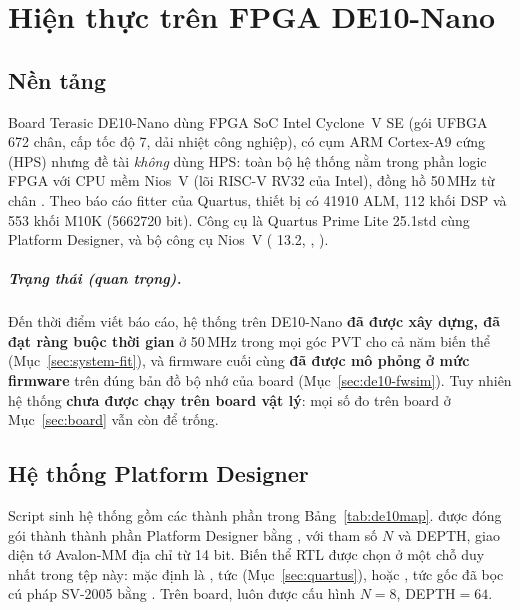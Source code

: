 \chapter{Hiện thực trên FPGA DE10-Nano}
\label{ch:fpga}

\section{Nền tảng}
Board Terasic DE10-Nano \cite{de10nano} dùng FPGA SoC Intel Cyclone~V SE  (gói UFBGA 672 chân, cấp tốc độ 7, dải nhiệt công nghiệp), có cụm ARM Cortex-A9 cứng (HPS) nhưng đề tài \emph{không} dùng HPS: toàn bộ hệ thống nằm trong phần logic FPGA với CPU mềm Nios~V \cite{niosv} (lõi RISC-V RV32 của Intel), đồng hồ 50\,MHz từ chân . Theo báo cáo fitter của Quartus, thiết bị có \num{41910} ALM, 112 khối DSP và 553 khối M10K (\num{5662720} bit). Công cụ là Quartus Prime Lite \cite{quartuslite} 25.1std cùng Platform Designer, và bộ công cụ Nios~V ( 13.2, , ).

\paragraph{Trạng thái (quan trọng).} Đến thời điểm viết báo cáo, hệ thống trên DE10-Nano \textbf{đã được xây dựng, đã đạt ràng buộc thời gian} ở 50\,MHz trong mọi góc PVT cho cả năm biến thể (Mục~\ref{sec:system-fit}), và firmware cuối cùng \textbf{đã được mô phỏng ở mức firmware} trên đúng bản đồ bộ nhớ của board (Mục~\ref{sec:de10-fwsim}). Tuy nhiên hệ thống \textbf{chưa được chạy trên board vật lý}: mọi số đo trên board ở Mục~\ref{sec:board} vẫn còn để trống.

\section{Hệ thống Platform Designer}
Script  sinh hệ thống  gồm các thành phần trong Bảng~\ref{tab:de10map}.  được đóng gói thành thành phần Platform Designer bằng , với tham số $N$ và DEPTH, giao diện tớ Avalon-MM địa chỉ từ 14 bit. Biến thể RTL được chọn ở một chỗ duy nhất trong tệp này: mặc định là , tức  (Mục~\ref{sec:quartus}), hoặc , tức  gốc đã bọc cú pháp SV-2005 bằng . Trên board, \NPU{} luôn được cấu hình $N=8$, DEPTH$=64$.

